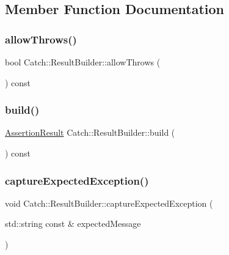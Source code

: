 \subsection{Member Function Documentation}
\hypertarget{class_catch_1_1_result_builder_a0428fd78ab9e8e6f1aca6855f20fc715}{}\label{class_catch_1_1_result_builder_a0428fd78ab9e8e6f1aca6855f20fc715} 
\subsubsection{\texorpdfstring{allow\+Throws()}{allowThrows()}}
{\footnotesize\ttfamily bool Catch\+::\+Result\+Builder\+::allow\+Throws (\begin{DoxyParamCaption}{ }\end{DoxyParamCaption}) const}

\hypertarget{class_catch_1_1_result_builder_a4fc96e7bb8b5f7119a8e79692ec97808}{}\label{class_catch_1_1_result_builder_a4fc96e7bb8b5f7119a8e79692ec97808} 
\subsubsection{\texorpdfstring{build()}{build()}}
{\footnotesize\ttfamily \hyperlink{class_catch_1_1_assertion_result}{Assertion\+Result} Catch\+::\+Result\+Builder\+::build (\begin{DoxyParamCaption}{ }\end{DoxyParamCaption}) const}

\hypertarget{class_catch_1_1_result_builder_a9ac96f6220c8dd8e4feee725c6228d77}{}\label{class_catch_1_1_result_builder_a9ac96f6220c8dd8e4feee725c6228d77} 
\subsubsection{\texorpdfstring{capture\+Expected\+Exception()}{captureExpectedException()}\hspace{0.1cm}{\footnotesize\ttfamily [1/2]}}
{\footnotesize\ttfamily void Catch\+::\+Result\+Builder\+::capture\+Expected\+Exception (\begin{DoxyParamCaption}\item[{std\+::string const \&}]{expected\+Message }\end{DoxyParamCaption})}

